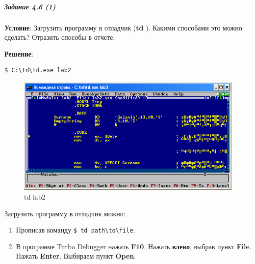 \subparagraph{Задание 4.6 (1)}

\textbf{Условие}:
Загрузить программу в отладчик (\textbf{td }). Какими способами это можно сделать? Отразить способы в отчете.

\textbf{Решение}:

\begin{lstlisting}[language=Terminal]
    $ C:\td\td.exe lab2
\end{lstlisting}

\begin{figure}[!htp]
    \centering
    \includegraphics[width=11.2cm]{../_INCLUDES/td.png}
    \caption{td lab2}
\end{figure}

Загрузить программу в отладчик можно:
\begin{enumerate}
    \item Прописав команду \verb|$ td path\to\file|.
    \item В программе Turbo Debugger нажать \textbf{F10}. Нажать \textbf{влево}, выбрав пункт \textbf{File}. Нажать \textbf{Enter}. Выбираем пункт \textbf{Open}.
\end{enumerate}

